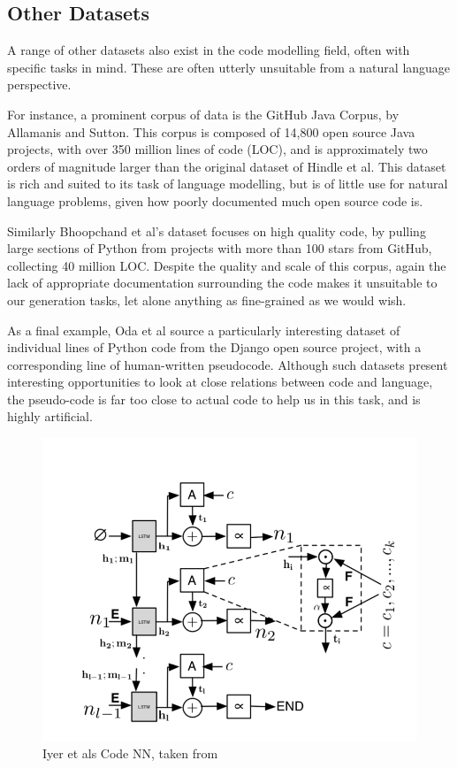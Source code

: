 \subsection{Other Datasets}
A range of other datasets also exist in the code modelling field, often with specific tasks in mind. These are often utterly unsuitable from a natural language perspective.

For instance, a prominent corpus of data is the GitHub Java Corpus, by Allamanis and Sutton\cite{allamanis_mining_2013}. This corpus is composed of 14,800 open source Java projects, with over 350 million lines of code (LOC), and is approximately two orders of magnitude larger than the original dataset of Hindle et al. This dataset is rich and suited to its task of language modelling, but is of little use for natural language problems, given how poorly documented much open source code is.

Similarly Bhoopchand et al's \cite{bhoopchand_learning_2016} dataset focuses on high quality code, by pulling large sections of Python from projects with more than 100 stars from GitHub, collecting 40 million LOC. 
Despite the quality and scale of this corpus, again the lack of appropriate documentation surrounding the code makes it unsuitable to our generation tasks, let alone anything as fine-grained as we would wish.

As a final example, Oda et al\cite{oda_learning_nodate} source a particularly interesting dataset of individual lines of Python code from the Django open source project, with a corresponding line of human-written pseudocode. Although such datasets present interesting opportunities to look at close relations between code and language, the pseudo-code is far too close to actual code to help us in this task, and is highly artificial. 



\begin{figure}[tb]
    \centering
    \includegraphics[width=0.5\linewidth]{ModelPics/Iyer_etal.png}
    \caption{Iyer et als Code NN, taken from \cite{iyer_summarizing_2016}}
    \label{fig:Iyer}
\end{figure}


